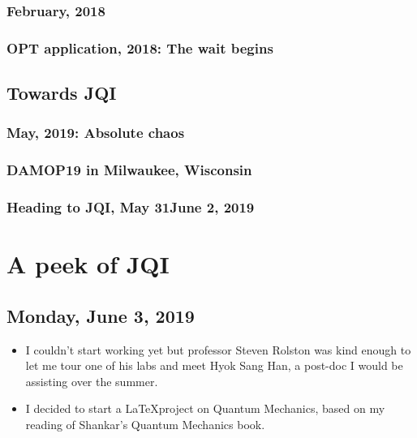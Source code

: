 \documentclass{report}
\theoremstyle{definition}
\begin{document}
\subsection{February, 2018}

\subsection{OPT application, 2018: The wait begins}






\section{Towards JQI}

\subsection{May, 2019: Absolute chaos}

\subsection{DAMOP19 in Milwaukee, Wisconsin}

\subsection{Heading to JQI, May 31\textendash June 2, 2019}


\chapter{A peek of JQI}

\section{Monday, June 3, 2019}

\begin{itemize}
	\item I couldn't start working yet but professor Steven Rolston was kind enough to let me tour one of his labs and meet Hyok Sang Han, a post-doc I would be assisting over the summer.  
	\item I decided to start a \LaTeX project on Quantum Mechanics, based on my reading of Shankar's Quantum Mechanics book. 
\end{itemize}
\end{document}
